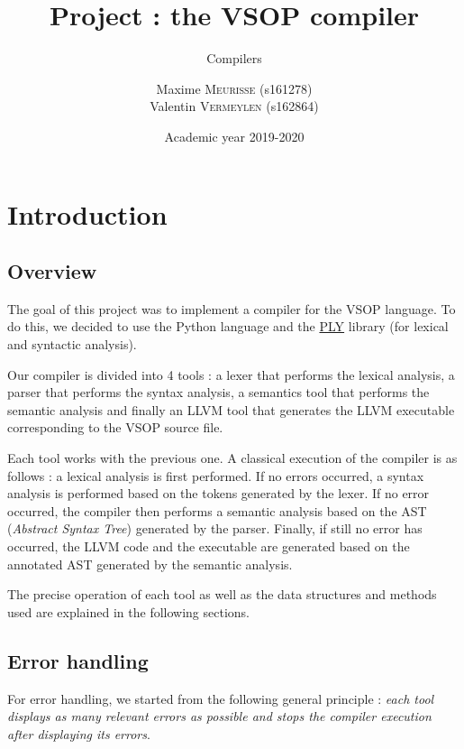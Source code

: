 \documentclass[a4paper, 12pt]{article}
\institute{University of Liège}
\title{Project : the VSOP compiler}
\subtitle{Compilers}
\author{
    Maxime \textsc{Meurisse} (s161278)\\
    Valentin \textsc{Vermeylen} (s162864)\\
}
\date{Academic year 2019-2020}
\begin{document}
    
    \maketitle
    
    
    \section{Introduction}
    
    \subsection{Overview}
    
    The goal of this project was to implement a compiler for the VSOP language. To do this, we decided to use the Python language and the \href{https://www.dabeaz.com/ply/}{PLY} library (for lexical and syntactic analysis).
    
    Our compiler is divided into 4 tools : a lexer that performs the lexical analysis, a parser that performs the syntax analysis, a semantics tool that performs the semantic analysis and finally an LLVM tool that generates the LLVM executable corresponding to the VSOP source file.
    
    Each tool works with the previous one. A classical execution of the compiler is as follows : a lexical analysis is first performed. If no errors occurred, a syntax analysis is performed based on the tokens generated by the lexer. If no error occurred, the compiler then performs a semantic analysis based on the AST ({\it Abstract Syntax Tree}) generated by the parser. Finally, if still no error has occurred, the LLVM code and the executable are generated based on the annotated AST generated by the semantic analysis.
    
    The precise operation of each tool as well as the data structures and methods used are explained in the following sections.
    
    \subsection{Error handling}
    
    For error handling, we started from the following general principle : {\it each tool displays as many relevant errors as possible and stops the compiler execution after displaying its errors}.
    
\end{document}
